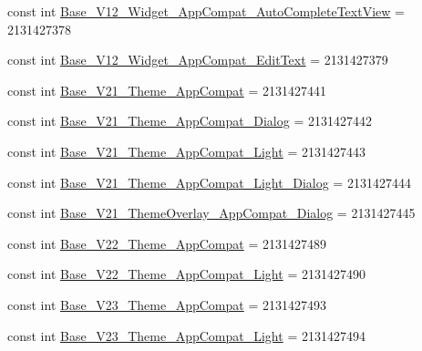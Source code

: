 \begin{DoxyCompactItemize}
\item 
const int \mbox{\hyperlink{class_f_w_p_s___app_1_1_droid_1_1_resource_1_1_style_a55cd63565b9b5607929ae88fd5da0a1b}{Base\+\_\+\+V12\+\_\+\+Widget\+\_\+\+App\+Compat\+\_\+\+Auto\+Complete\+Text\+View}} = 2131427378
\item 
const int \mbox{\hyperlink{class_f_w_p_s___app_1_1_droid_1_1_resource_1_1_style_a1046ff6cf390a7400aedbe62a5fa9023}{Base\+\_\+\+V12\+\_\+\+Widget\+\_\+\+App\+Compat\+\_\+\+Edit\+Text}} = 2131427379
\item 
const int \mbox{\hyperlink{class_f_w_p_s___app_1_1_droid_1_1_resource_1_1_style_ad0e36982aca6f0378754fab0af69aa90}{Base\+\_\+\+V21\+\_\+\+Theme\+\_\+\+App\+Compat}} = 2131427441
\item 
const int \mbox{\hyperlink{class_f_w_p_s___app_1_1_droid_1_1_resource_1_1_style_a99047f72a998c9ae06fd1a3124177dfe}{Base\+\_\+\+V21\+\_\+\+Theme\+\_\+\+App\+Compat\+\_\+\+Dialog}} = 2131427442
\item 
const int \mbox{\hyperlink{class_f_w_p_s___app_1_1_droid_1_1_resource_1_1_style_aef63d6357f32630b0d16f7b917bf536b}{Base\+\_\+\+V21\+\_\+\+Theme\+\_\+\+App\+Compat\+\_\+\+Light}} = 2131427443
\item 
const int \mbox{\hyperlink{class_f_w_p_s___app_1_1_droid_1_1_resource_1_1_style_a4bc9b1bdb22de06d00027edf697d69fb}{Base\+\_\+\+V21\+\_\+\+Theme\+\_\+\+App\+Compat\+\_\+\+Light\+\_\+\+Dialog}} = 2131427444
\item 
const int \mbox{\hyperlink{class_f_w_p_s___app_1_1_droid_1_1_resource_1_1_style_a9e88aa93789325a8160c3aaeb7f3669f}{Base\+\_\+\+V21\+\_\+\+Theme\+Overlay\+\_\+\+App\+Compat\+\_\+\+Dialog}} = 2131427445
\item 
const int \mbox{\hyperlink{class_f_w_p_s___app_1_1_droid_1_1_resource_1_1_style_ab599f25faab326d6a55af50fd6c7c0c4}{Base\+\_\+\+V22\+\_\+\+Theme\+\_\+\+App\+Compat}} = 2131427489
\item 
const int \mbox{\hyperlink{class_f_w_p_s___app_1_1_droid_1_1_resource_1_1_style_a17047c0f065fbb6a9cb79adebc194c64}{Base\+\_\+\+V22\+\_\+\+Theme\+\_\+\+App\+Compat\+\_\+\+Light}} = 2131427490
\item 
const int \mbox{\hyperlink{class_f_w_p_s___app_1_1_droid_1_1_resource_1_1_style_a6156924c33e5b72bf63168480d55b2eb}{Base\+\_\+\+V23\+\_\+\+Theme\+\_\+\+App\+Compat}} = 2131427493
\item 
const int \mbox{\hyperlink{class_f_w_p_s___app_1_1_droid_1_1_resource_1_1_style_a3b3f3f89ac15806fcdcab5273ecb3f81}{Base\+\_\+\+V23\+\_\+\+Theme\+\_\+\+App\+Compat\+\_\+\+Light}} = 2131427494

\end{DoxyCompactItemize}
